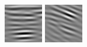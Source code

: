 \begin{figure}
\begin{center}
  \includegraphics[width=\columnwidth/9]{ch4/figures/imag_2_4.jpg}
  \includegraphics[width=\columnwidth/9]{ch4/figures/imag_2_5.jpg}

\end{center}
\end{figure}
